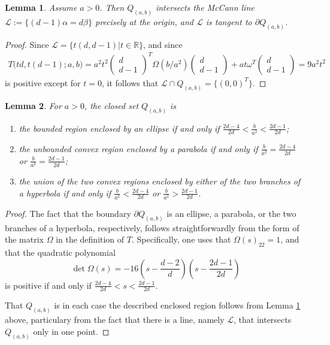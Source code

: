 \documentclass[reqno]{amsart}
\newtheorem{lemma}{Lemma}[section]
\newcommand{\R}{\mathbb{R}}
\begin{document}
\begin{lemma}\label{lem:geometry0}
  Assume $a> 0$. Then
  $Q_{(a,b)}$ intersects the McCann line $\mathcal L:=\{(d-1)\alpha=d\beta\}$ precisely at the origin, and $\mathcal L$ is tangent to $\partial Q_{(a,b)}$.
\end{lemma}
%
\begin{proof}
  Since $\mathcal L=\{t(d,d-1)|t\in\R\}$,
  and since
  \begin{align*}
    T\big(td,t(d-1);a,b)
    = a^2t^2
    \begin{pmatrix} d \\ d-1 \end{pmatrix}^T
    \Omega(b/a^2)
    \begin{pmatrix} d \\ d-1 \end{pmatrix}
    +
    at\omega^T \begin{pmatrix} d \\ d-1 \end{pmatrix}
    = 9a^2t^2
  \end{align*}
  is positive except for $t=0$,
  it follows that $\mathcal L\cap Q_{(a,b)}=\{(0,0)^T\}$.
\end{proof}
%
\begin{lemma}\label{lem-elip}
For $a> 0$, the closed set $Q_{(a,b)}$ is
\begin{enumerate}
\item[(a)] the bounded region enclosed by an ellipse
  if and only if $\frac{2d-4}{2d}<\frac b{a^2}<\frac{2d-1}{2d}$;
\item[(b)] the unbounded convex region enclosed by a parabola 
  if and only if  $\frac b{a^2}=\frac{2d-4}{2d}$ or $\frac b{a^2}=\frac{2d-1}{2d}$;
\item[(c)] the union of the two convex regions enclosed by either of the two branches of a hyperbola
  if and only if $\frac b{a^2}<\frac{2d-4}{2d}$ or $\frac b{a^2}>\frac{2d-1}{2d}$.
\end{enumerate}
\end{lemma}
%
\begin{proof}
  The fact that the boundary $\partial Q_{(a,b)}$ is 
  an ellipse, a parabola, or the two branches of a hyperbola, respectively,
  follows straightforwardly from the form of the matrix $\Omega$ in the definition of $T$.
  Specifically, one uses that $\Omega(s)_{22}=1$, 
  and that the quadratic polynomial
  \begin{equation*}
    \det \Omega(s) = -16\left(s-\frac{d-2}{d}\right)\left(s-\frac{2d-1}{2d}\right)
  \end{equation*}
  is positive if and only if $\frac{2d-4}{2d}<s<\frac{2d-1}{2d}$.
  
  That $Q_{(a,b)}$ is in each case the described enclosed region 
  follows from Lemma \ref{lem:geometry0} above,
  particulary from the fact that there is a line, namely $\mathcal L$, that intersects $Q_{(a,b)}$ only in one point.
\end{proof}
\end{document}
